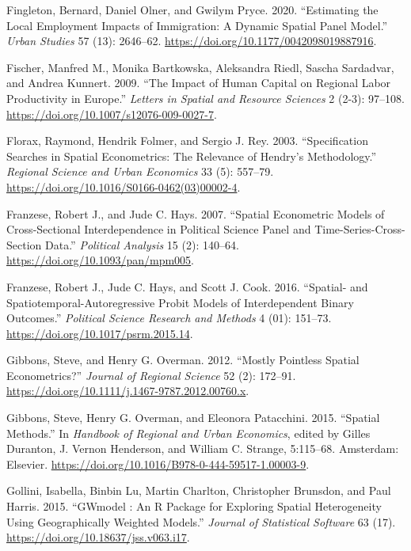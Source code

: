 \documentclass[
  letterpaper,
]{scrbook}
\newlength{\cslhangindent}
\newlength{\cslentryspacingunit} %
\newenvironment{CSLReferences}[2] %
 {%
  \setlength{\parindent}{0pt}
  \ifodd #1
  \let\oldpar\par
  \def\par{\hangindent=\cslhangindent\oldpar}
  \fi
  \setlength{\parskip}{#2\cslentryspacingunit}
 }%
 {}
\begin{document}
\begin{CSLReferences}{1}{0}
\leavevmode{}%
Fingleton, Bernard, Daniel Olner, and Gwilym Pryce. 2020. {``Estimating
the Local Employment Impacts of Immigration: {A} Dynamic Spatial Panel
Model.''} \emph{Urban Studies} 57 (13): 2646--62.
\url{https://doi.org/10.1177/0042098019887916}.

\leavevmode{}%
Fischer, Manfred M., Monika Bartkowska, Aleksandra Riedl, Sascha
Sardadvar, and Andrea Kunnert. 2009. {``The Impact of Human Capital on
Regional Labor Productivity in {Europe}.''} \emph{Letters in Spatial and
Resource Sciences} 2 (2-3): 97--108.
\url{https://doi.org/10.1007/s12076-009-0027-7}.

\leavevmode{}%
Florax, Raymond, Hendrik Folmer, and Sergio J. Rey. 2003.
{``Specification {Searches} in {Spatial Econometrics}: {The Relevance}
of {Hendry}'s {Methodology}.''} \emph{Regional Science and Urban
Economics} 33 (5): 557--79.
\url{https://doi.org/10.1016/S0166-0462(03)00002-4}.

\leavevmode{}%
Franzese, Robert J., and Jude C. Hays. 2007. {``Spatial {Econometric
Models} of {Cross-Sectional Interdependence} in {Political Science
Panel} and {Time-Series-Cross-Section Data}.''} \emph{Political
Analysis} 15 (2): 140--64. \url{https://doi.org/10.1093/pan/mpm005}.

\leavevmode{}%
Franzese, Robert J., Jude C. Hays, and Scott J. Cook. 2016. {``Spatial-
and {Spatiotemporal-Autoregressive Probit Models} of {Interdependent
Binary Outcomes}.''} \emph{Political Science Research and Methods} 4
(01): 151--73. \url{https://doi.org/10.1017/psrm.2015.14}.

\leavevmode{}%
Gibbons, Steve, and Henry G. Overman. 2012. {``Mostly {Pointless Spatial
Econometrics}?''} \emph{Journal of Regional Science} 52 (2): 172--91.
\url{https://doi.org/10.1111/j.1467-9787.2012.00760.x}.

\leavevmode{}%
Gibbons, Steve, Henry G. Overman, and Eleonora Patacchini. 2015.
{``Spatial {Methods}.''} In \emph{Handbook of {Regional} and {Urban
Economics}}, edited by Gilles Duranton, J. Vernon Henderson, and William
C. Strange, 5:115--68. {Amsterdam}: {Elsevier}.
\url{https://doi.org/10.1016/B978-0-444-59517-1.00003-9}.

\leavevmode{}%
Gollini, Isabella, Binbin Lu, Martin Charlton, Christopher Brunsdon, and
Paul Harris. 2015. {``{GWmodel} : {An R Package} for {Exploring Spatial
Heterogeneity Using Geographically Weighted Models}.''} \emph{Journal of
Statistical Software} 63 (17).
\url{https://doi.org/10.18637/jss.v063.i17}.


\end{CSLReferences}
\end{document}
